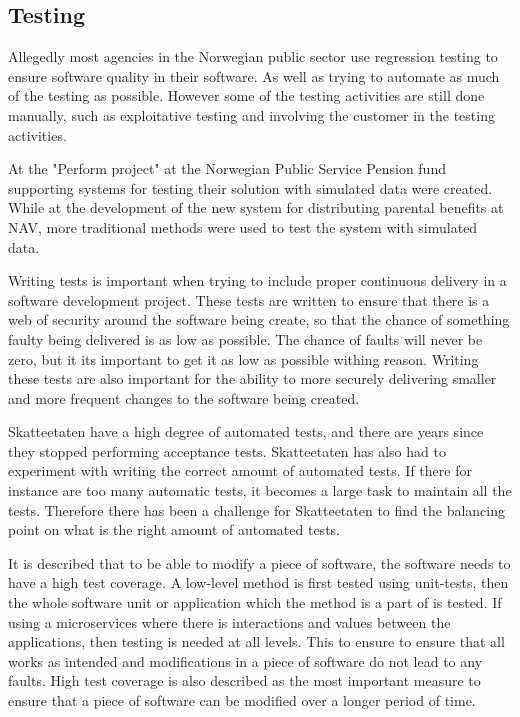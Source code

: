 
\subsection{Testing}
Allegedly most agencies in the Norwegian public sector use regression testing to ensure software quality in their software. As well as trying to automate as much of the testing as possible. However some of the testing activities are still done manually, such as exploitative testing and involving the customer in the testing activities. 

At the "Perform project" at the Norwegian Public Service Pension fund supporting systems for testing their solution with simulated data were created. While at the development of the new system for distributing parental benefits at NAV, more traditional methods were used to test the system with simulated data.

Writing tests is important when trying to include proper continuous delivery in a software development project. These tests are written to ensure that there is a web of security around the software being create, so that the chance of something faulty being delivered is as low as possible. The chance of faults will never be zero, but it its important to get it as low as possible withing reason. Writing these tests are also important for the ability to more securely delivering smaller and more frequent changes to the software being created.

Skatteetaten have a high degree of automated tests, and there are years since they stopped performing acceptance tests. Skatteetaten has also had to experiment with writing the correct amount of automated tests. If there for instance are too many automatic tests, it becomes a large task to maintain all the tests. Therefore there has been a challenge for Skatteetaten to find the balancing point on what is the right amount of automated tests.

It is described that to be able to modify a piece of software, the software needs to have a high test coverage. A low-level method is first tested using unit-tests, then the whole software unit or application which the method is a part of is tested. If using a \gls{microservices} where there is interactions and values between the applications, then testing is needed at all levels. This to ensure to ensure that all works as intended and modifications in a piece of software do not lead to any faults. High test coverage is also described as the most important measure to ensure that a piece of software can be modified over a longer period of time.

